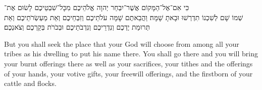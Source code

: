 \begin{hebrewtext}
    כִּי אִם־אֶל־הַמָּקוֹם אֲשֶׁר־יִבְחַר יְהוָה אֱלֹהֵיכֶם מִכָּל־שִׁבְטֵיכֶם לָשׂוּם אֶת־\\שְׁמוֹ שָׁם לְשִׁכְנוֹ תִדְרְשׁוּ וּבָאתָ שָׁמָּה׃
    וַהֲבֵאתֶם שָׁמָּה עֹלֹתֵיכֶם וְזִבְחֵיכֶם וְאֵת מַעְשְׂרֹתֵיכֶם וְאֵת תְּרוּמַת יֶדְכֶם וְנִדְרֵיכֶם וְנִדְבֹתֵיכֶם וּבְכֹרֹת בְּקַרְכֶם וְצֹאנְכֶם׃
\end{hebrewtext}
\begin{translation}
    But you shall seek the place that \yahweh your God will choose from among all your tribes as his dwelling to put his name there. You shall go there
    and you will bring your burnt offerings there as well as your sacrifices, your tithes and the offerings of your hands, your votive gifts, your freewill offerings, and the firstborn of your cattle and flocks. 
\end{translation}

